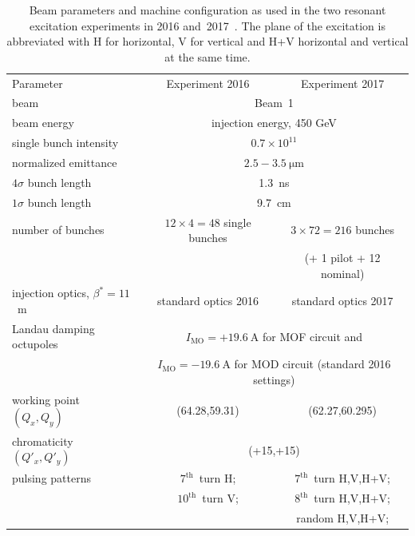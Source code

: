 \documentclass[%
 reprint,
 amsmath,amssymb,
 aps,
prstab,
]{revtex4-1}
\begin{document}
\begin{table}
	\caption{\label{tab:md_param}%
		Beam parameters and machine configuration as used in the two resonant excitation experiments in 2016 and~2017~\cite{resexmd2016,resexmd2017}. The plane of the excitation is abbreviated with H for horizontal, V for vertical and H+V horizontal and vertical at the same time.
	}
	\begin{ruledtabular}
		\begin{tabular}{lcc}
			Parameter & Experiment 2016 & Experiment 2017  \\
			\colrule
			beam &\multicolumn{2}{c}{Beam~1} \\
			beam energy &\multicolumn{2}{c}{injection energy, 450 GeV} \\\hline
			single bunch intensity &\multicolumn{2}{c}{$0.7\times10^{11}$} \\
			normalized emittance &\multicolumn{2}{c}{$2.5-3.5~\mathrm{\mu m}$} \\
			$4\sigma$ bunch length & \multicolumn{2}{c}{1.3~ns}\\
			$1\sigma$ bunch length & \multicolumn{2}{c}{9.7~cm}\\
			number of bunches & $12\times4=48$ single bunches & $3\times72=216$ bunches\\
			&  & (+ 1 pilot + 12 nominal) \\\hline
			injection optics, $\beta^*=11$~m & standard optics 2016 & standard optics 2017\\
			Landau damping octupoles  & \multicolumn{2}{c}{$I_{\mathrm{MO}}=+19.6~\mathrm{A}$ for MOF circuit and}\\
			& \multicolumn{2}{c}{$I_{\mathrm{MO}}=-19.6~\mathrm{A}$ for MOD circuit (standard 2016 settings)}\\\hline
			working point $(Q_x,Q_y)$ & (64.28,59.31) & (62.27,60.295) \\
			chromaticity $(Q'_x,Q'_y)$ & \multicolumn{2}{c}{(+15,+15)}\\\hline
			pulsing patterns  &$7^{\mathrm{th}}$~turn H; &$7^{\mathrm{th}}$~turn H,V,H+V; \\
			& $10^{\mathrm{th}}$~turn V; & $8^{\mathrm{th}}$~turn H,V,H+V; \\
			& &  random  H,V,H+V;\\
		\end{tabular}
	\end{ruledtabular}
\end{table}
\end{document}
